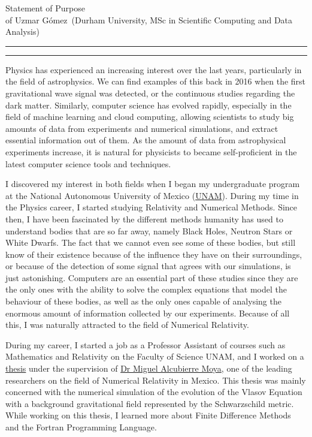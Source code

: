 \documentclass{article}
\newcommand{\soptitle}{Statement of Purpose}
\newcommand{\yourname}{Uzmar G\'omez}
\begin{document}
\begin{center}\LARGE\soptitle\\
\large of \yourname\ (Durham University, MSc in Scientific Computing and Data Analysis)
\end{center}

\hrule
\vspace{1pt}
\hrule height 1pt

\bigskip

Physics has experienced an increasing interest over the last years, particularly in the field of astrophysics. We can find examples of this back in 2016 when the first gravitational wave signal was detected, or the continuous studies regarding the dark matter. Similarly, computer science has evolved rapidly, especially in the field of machine learning and cloud computing, allowing scientists to study big amounts of data from experiments and numerical simulations, and extract essential information out of them. As the amount of data from astrophysical experiments increase, it is natural for physicists to became self-proficient in the latest computer science tools and techniques.

I discovered my interest in both fields when I began my undergraduate program at the National Autonomous University of Mexico (\href{https://www.unam.mx/}{UNAM}). During my time in the Physics career, I started studying Relativity and Numerical Methods. Since then, I have been fascinated by the different methods humanity has used to understand bodies that are so far away, namely Black Holes, Neutron Stars or White Dwarfs. The fact that we cannot even see some of these bodies, but still know of their existence because of the influence they have on their surroundings, or because of the detection of some signal that agrees with our simulations, is just astonishing. Computers are an essential part of these studies since they are the only ones with the ability to solve the complex equations that model the behaviour of these bodies, as well as the only ones capable of analysing the enormous amount of information collected by our experiments. Because of all this, I was naturally attracted to the field of Numerical Relativity.

During my career, I started a job as a Professor Assistant of courses such as Mathematics and Relativity on the Faculty of Science UNAM, and I worked on a \href{http://oreon.dgbiblio.unam.mx/F/YF3LAD8UIUFR2XRPDE3H6JM2MI44M8RY8QX1RH7K429163KKEV-19694?func=find-b&request=uzmar&find_code=WRD&adjacent=N&local_base=TES01&x=65&y=13&filter_code_2=WYR&filter_request_2=&filter_code_3=WYR&filter_request_3=}{thesis} under the supervision of  \href{https://sigi.nucleares.unam.mx/sgiicn/people/user/view/id/8}{Dr Miguel Alcubierre Moya}, one of the leading researchers on the field of Numerical Relativity in Mexico. This thesis was mainly concerned with the numerical simulation of the evolution of the Vlasov Equation with a background gravitational field represented by the Schwarzschild metric. While working on this thesis, I learned more about Finite Difference Methods and the Fortran Programming Language. 
\end{document}
